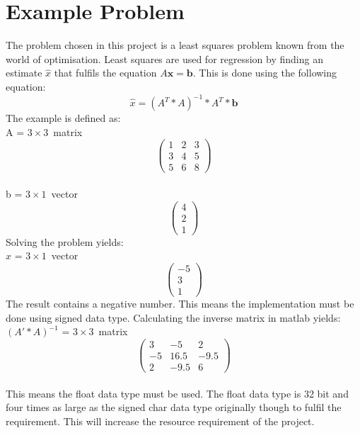\section{Example Problem}
\label{sec:example}
The problem chosen in this project is a least squares problem known from the world of optimisation. Least squares are used for regression by finding an estimate $\hat{x}$ that fulfils the equation $A\textbf{x} = \textbf{b}$. This is done using the following equation:
\begin{equation}
\label{leastsquares}
\hat{x} = (A^T * A)^{-1}*A^T*\textbf{b}
\end{equation}
The example is defined as:\\
A = $3 \times 3$~matrix
\[ \left( \begin{array}{ccc}
1 & 2 & 3 \\
3 & 4 & 5 \\
5 & 6 & 8 \end{array} \right)\] \\
b = $3 \times 1$~vector
\[ \left( \begin{array}{c}
4 \\
2 \\
1 \end{array} \right)\]
Solving the problem yields:\\
$\hat{x}$ = $3 \times 1$~vector
\[ \left( \begin{array}{c}
-5 \\
3 \\
1 \end{array} \right)\]
The result contains a negative number. This means the implementation must be done using signed data type. Calculating the inverse matrix in matlab yields:\\
$(A' * A)^{-1}$ = $3 \times 3$~matrix
\[ \left( \begin{array}{ccc}
3 & -5 & 2 \\
-5 & 16.5 & -9.5 \\
2 & -9.5 & 6 \end{array} \right)\] \\
This means the float data type must be used. The float data type is 32 bit and four times as large as the signed char data type originally though to fulfil the requirement. This will increase the resource requirement of the project.

